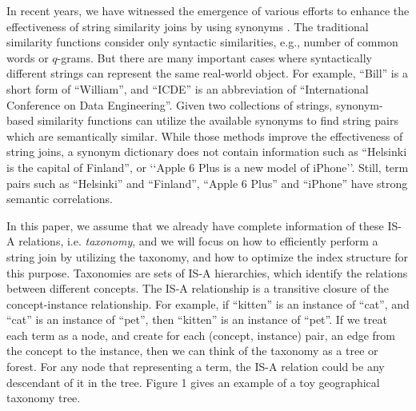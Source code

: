 
In recent years, we have witnessed the emergence of various efforts to enhance the effectiveness of string similarity joins by using synonyms \cite{conf/sigmod/LuLWLW13,conf/icde/ArasuCK08,conf/cpm/BarbayGMR06,conf/vldb/ArvindSR09}.
The traditional similarity functions consider only syntactic similarities, e.g., number of common
words or $q$-grams. But there are many important cases where syntactically different
strings can represent the same real-world object. For example,
``\textsf{Bill}'' is a short form of ``\textsf{William}'', and ``\textsf{ICDE}'' is an abbreviation of  ``\textsf{International Conference on Data Engineering}''.  Given two collections of strings,  synonym-based similarity functions can utilize the available synonyms to find string pairs which are semantically similar. While those methods improve the effectiveness of string joins, a synonym dictionary does not contain information such as
``\textsf{Helsinki is the capital of Finland}'', or `\textsf{`Apple 6 Plus is a new model of iPhone}''. Still, term pairs such as ``\textsf{Helsinki}'' and ``\textsf{Finland}'', ``\textsf{Apple 6 Plus}'' and ``\textsf{iPhone}''  have strong semantic correlations.


In this paper, we assume that we already have complete
information of these IS-A relations, i.e. \textit{taxonomy}, and we will focus on how
to efficiently perform a string join by utilizing the taxonomy, and how to optimize the index structure
for this purpose.  Taxonomies are sets of IS-A hierarchies, which identify the relations between different concepts. The IS-A relationship
is a transitive closure of the concept-instance relationship.
For example, if ``\textsf{kitten}'' is an instance of ``\textsf{cat}'', and
``\textsf{cat}'' is an instance of ``\textsf{pet}'', then ``\textsf{kitten}'' is an instance
of ``\textsf{pet}''. If we treat each term as a node, and create
for each (concept, instance) pair, an edge from the concept
to the instance, then we can think of the taxonomy as a tree or forest. For any node that representing a term,
the IS-A relation could be any descendant of it in the tree. Figure
1 gives an example of a toy geographical taxonomy tree.

